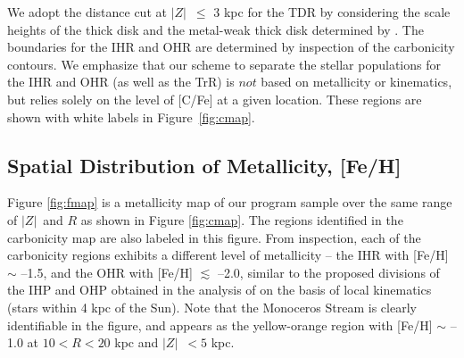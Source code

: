 \documentclass[iop]{emulateapj}
\newcommand*{\cfe}{[C/Fe]}
\newcommand*{\z}{$|Z|$}
\begin{document}
\begin{figure*}
\centering
{}
\caption{Histograms of the normalized fractions of metallicities ([Fe/H], 
left panels) and carbonicities (\cfe, right panels) in the four regions we have
identified (see text). The labels TDR, IHR, TrR, and OHR represent the
thick-disk region, the inner-halo region, the transition region, and the
outer-halo region, respectively, defined on the basis of Figure
\ref{fig:cmap}. The total number ($N_{\rm tot}$)
of stars for each region is listed in each panel. The vertical
dashed lines in the left panels represent the mean metallicity of
the canonical thick disk, [Fe/H] = --0.6, the IHP, [Fe/H] = --1.6, and the OHP, [Fe/H] =
--2.2, according to \citet{carollo2007, carollo2010}. Gaussians derived from
a simple mixture-model analysis are shown in blue for the IHP, red for
the OHP, and green for the canonical TDP. The two vertical lines in the
right panels denote the solar \cfe\ and \cfe\ = $+$0.7. The
total number of stars in each region shown in the right panels
is the same as in the left panels.}
\label{fig:mdf}
\end{figure*}

We adopt the distance cut at \z\ $\leq$ 3 kpc for the TDR by considering the
scale heights of the thick disk and the metal-weak thick disk determined by
\citet{carollo2010}. The boundaries for the IHR and OHR are determined
by inspection of the carbonicity contours. We emphasize that our scheme
to separate the stellar populations for the IHR and OHR (as well as the
TrR) is $not$ based on metallicity or kinematics, but relies solely on
the level of [C/Fe] at a given location. These regions are shown
with white labels in Figure~\ref{fig:cmap}.

\subsection{Spatial Distribution of Metallicity, [Fe/H]}

Figure \ref{fig:fmap} is a metallicity map of our program sample over
the same range of \z\ and $R$ as shown in Figure \ref{fig:cmap}. The
regions identified in the carbonicity map are also labeled in this
figure. From inspection, each of the carbonicity regions exhibits a different 
level of metallicity -- the IHR with [Fe/H] $\sim$ --1.5, and
the OHR with [Fe/H] $\lesssim$ --2.0, similar to the proposed divisions
of the IHP and OHP obtained in the analysis of \citet{carollo2007,
carollo2010} on the basis of local kinematics (stars within 4 kpc of the
Sun). Note that the Monoceros Stream \citep{newberg2002, ivezic2008} is
clearly identifiable in the figure, and appears as the yellow-orange
region with [Fe/H] $\sim$ --1.0 at $ 10 < R < 20$ kpc and \z\ $< 5$ kpc.
\end{document}
